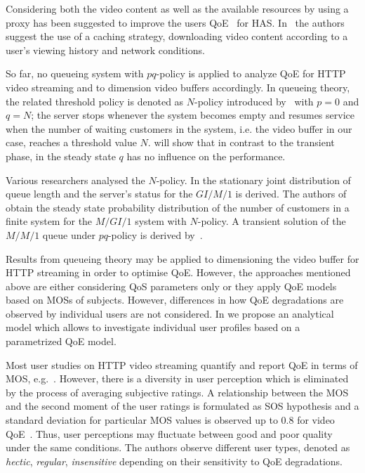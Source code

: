 Considering both the video content as well as the available resources by using a proxy has been suggested to improve the users \gls{QoE}~\cite{Essaili2013} for \gls{HAS}.
In~\cite{Xin2012} the authors suggest the use of a caching strategy, downloading video content according to a user's viewing history and network conditions.

So far, no queueing system with \(pq\)-policy is applied to analyze \gls{QoE} for \gls{HTTP} video streaming and to dimension video buffers accordingly.
In queueing theory, the related threshold policy is denoted as \(N\)-policy introduced by~\cite{Yadin1963} with \(p=0\) and \(q=N\); the server stops whenever the system becomes empty and resumes service when the number of waiting customers in the system, i.e. the video buffer in our case, reaches a threshold value \(N\).
 will show that in  contrast to the transient phase, in the steady state \(q\) has no influence on the performance. 

Various researchers analysed the \(N\)-policy.
In \cite{Zhang2004} the stationary joint distribution of queue length and the server's status for the \(GI/M/1\) is derived.
The authors of \cite{Wang2000} obtain the steady state probability distribution of the number of customers in a finite system for the \(M/GI/1\) system with \(N\)-policy.
A transient solution of the \(M/M/1\) queue under \(pq\)-policy is derived by~\cite{Boehm1993}.

Results from queueing theory may be applied to dimensioning the video buffer for \gls{HTTP} streaming in order to optimise \gls{QoE}. 
However, the approaches mentioned above are either considering \gls{QoS} parameters only or they apply \gls{QoE} models based on \glspl{MOS} of subjects.
However, differences in how \gls{QoE} degradations are observed by individual users are not considered.
In  we propose an analytical model which allows to investigate individual user profiles based on a parametrized QoE model.

Most user studies on \gls{HTTP} video streaming quantify and report \gls{QoE} in terms of \gls{MOS}, e.g.~\cite{Hossfeld2013c}.
However, there is a diversity in user perception which is eliminated by the process of averaging subjective ratings.
A relationship between the \gls{MOS} and the second moment of the user ratings is formulated as \gls{SOS} hypothesis and a standard deviation for particular \gls{MOS} values is observed up to \(0.8\) for video \gls{QoE}~\cite{Hossfeld2011b}. 
Thus, user perceptions may fluctuate between good and poor quality under the same conditions. The authors observe different user types, denoted as \emph{hectic}, \emph{regular}, \emph{insensitive} depending on their sensitivity to \gls{QoE} degradations.

